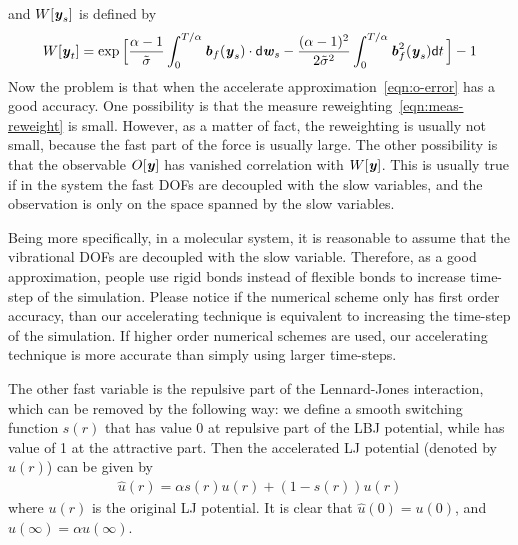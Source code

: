 \documentclass[aip,jcp,a4paper,reprint,onecolumn]{revtex4-1}
\newcommand{\vect}[1]{\textbf{\textit{#1}}}
\newcommand{\dd}{\textsf{d}}
\begin{document}
and $W[\vect y_s]$ is defined by
\begin{align}
  W[\vect y_t] = 
  \exp
  \Big[
  \frac{\alpha-1}{\tilde{\sigma}}\int_0^{T/\alpha}\vect b_f(\vect y_s)\cdot\dd\vect w_s
  -
  \frac{(\alpha-1)^2}{2\tilde\sigma^2} \int_0^{T/\alpha}\vect b_f^2(\vect y_s)\dd t\,
  \Big]
  -1
\end{align}
Now the problem is that when the accelerate
approximation~\eqref{eqn:o-error} has a good accuracy. One possibility
is that the measure reweighting~\eqref{eqn:meas-reweight} is small.
However, as a matter of fact, the reweighting is usually not small,
because the fast part of the force is usually large. The other possibility
is that the observable $O[\vect y]$ has vanished correlation with
$W[\vect y]$.
This is usually true if in the system the fast DOFs are decoupled with
the slow variables, and the observation is only on the space spanned
by the slow variables.


Being more specifically, in a molecular system, it is reasonable to
assume that the vibrational DOFs are decoupled with the slow variable.
Therefore, as a good approximation, people use rigid bonds instead of
flexible bonds to increase time-step of the simulation. Please notice
if the numerical scheme only has first order accuracy, than our accelerating
technique is equivalent to increasing the time-step of the simulation.
If higher order numerical schemes are used, our accelerating technique
is more accurate than simply using larger time-steps.

The other fast variable is the repulsive part of the Lennard-Jones
interaction, which can be removed by the following way: we define a
smooth switching function $s(r)$ that has value 0 at repulsive part of
the LBJ potential, while has value of 1 at the attractive part. Then
the accelerated LJ potential (denoted by $\hat u(r)$) can be given by
\begin{align}
  \hat u(r) = \alpha s(r) u(r) + (1 - s(r)) u(r)
\end{align}
where $u(r)$ is the original LJ potential. It is clear that
 $\hat u(0) = u(0)$, and $\hat u(\infty) = \alpha u(\infty)$.
\end{document}
